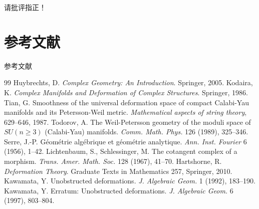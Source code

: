 \documentclass{beamer}
\theoremstyle{definition}
\theoremstyle{plain}
\begin{document}
\begin{frame}
\begin{center}
\Large 请批评指正！
\end{center}
\end{frame}

\section*{参考文献}
\begin{frame}[allowframebreaks]{参考文献}
\footnotesize
\begin{thebibliography}{99}
 Huybrechts, D. \textit{Complex Geometry: An Introduction}. Springer, 2005.
 Kodaira, K. \textit{Complex Manifolds and Deformation of Complex Structures}. Springer, 1986.
 Tian, G. Smoothness of the universal deformation space of compact Calabi-Yau manifolds and its Petersson-Weil metric. \textit{Mathematical aspects of string theory}, 629--646, 1987.
 Todorov, A. The Weil-Petersson geometry of the moduli space of $SU(n\ge 3)$ (Calabi-Yau) manifolds. \textit{Comm. Math. Phys.} 126 (1989), 325--346.
 Serre, J.-P. Géométrie algébrique et géométrie analytique. \textit{Ann. Inst. Fourier} 6 (1956), 1--42.
 Lichtenbaum, S., Schlessinger, M. The cotangent complex of a morphism. \textit{Trans. Amer. Math. Soc.} 128 (1967), 41--70.
 Hartshorne, R. \textit{Deformation Theory}. Graduate Texts in Mathematics 257, Springer, 2010.
 Kawamata, Y. Unobstructed deformations. \textit{J. Algebraic Geom.} 1 (1992), 183--190.
 Kawamata, Y. Erratum: Unobstructed deformations. \textit{J. Algebraic Geom.} 6 (1997), 803--804.
\end{thebibliography}
\end{frame}
\end{document}
